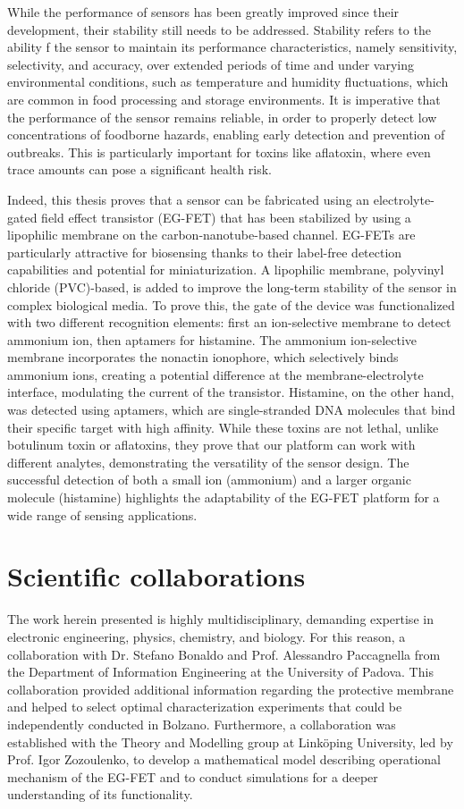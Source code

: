 While the performance of sensors has been greatly improved since their
development, their stability still needs to be addressed. Stability refers to
the ability f the sensor to maintain its performance characteristics, namely
sensitivity, selectivity, and accuracy, over extended periods of time and under
varying environmental conditions, such as temperature and humidity fluctuations,
which are common in food processing and storage environments. It is imperative
that the performance of the sensor remains reliable, in order to properly detect
low concentrations of foodborne hazards, enabling early detection and prevention
of outbreaks. This is particularly important for toxins like aflatoxin, where
even trace amounts can pose a significant health risk.

Indeed, this thesis proves that a sensor can be fabricated using an
electrolyte-gated field effect transistor (EG-FET) that has been stabilized by
using a lipophilic membrane on the carbon-nanotube-based channel. EG-FETs are
particularly attractive for biosensing thanks to their label-free detection
capabilities and potential for miniaturization. A lipophilic membrane, polyvinyl
chloride (PVC)-based, is added to improve the long-term stability of the sensor
in complex biological media. To prove this, the gate of the device was
functionalized with two different recognition elements: first an ion-selective
membrane to detect ammonium ion, then aptamers for histamine. The ammonium
ion-selective membrane incorporates the nonactin ionophore, which selectively
binds ammonium ions, creating a potential difference at the membrane-electrolyte
interface, modulating the current of the transistor. Histamine, on the other
hand, was detected using aptamers, which are single-stranded DNA molecules that
bind their specific target with high affinity. While these toxins are not
lethal, unlike botulinum toxin or aflatoxins, they prove that our platform can
work with different analytes, demonstrating the versatility of the sensor
design. The successful detection of both a small ion (ammonium) and a larger
organic molecule (histamine) highlights the adaptability of the EG-FET platform
for a wide range of sensing applications.

\section{Scientific collaborations}

The work herein presented is highly multidisciplinary, demanding expertise in
electronic engineering, physics, chemistry, and biology. For this reason, a
collaboration with Dr. Stefano Bonaldo and Prof. Alessandro Paccagnella from the
Department of Information Engineering at the University of Padova. This
collaboration provided additional information regarding the protective membrane
and helped to select optimal characterization experiments that could be
independently conducted in Bolzano. Furthermore, a collaboration was established
with the Theory and Modelling group at Linköping University, led by Prof. Igor
Zozoulenko, to develop a mathematical model describing operational mechanism of
the EG-FET and to conduct simulations for a deeper understanding of its
functionality.

